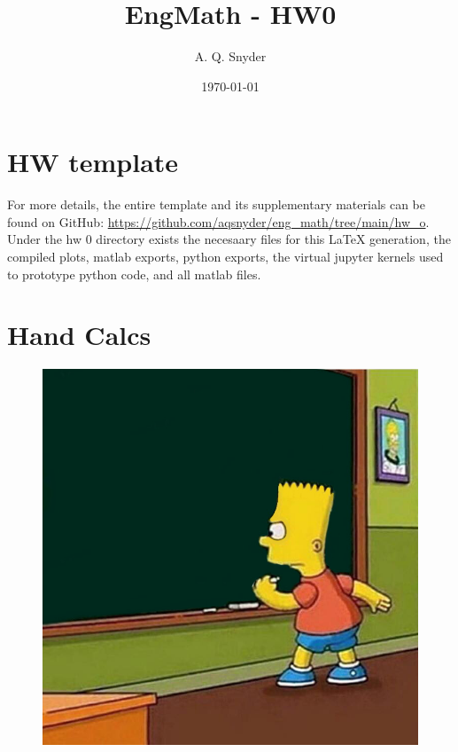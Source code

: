 \documentclass{article}
\begin{document}
\title{EngMath - HW0}
\author{A. Q. Snyder}
\date{\today}

\maketitle

\section{HW template}

\parbox{\textwidth}{
For more details, the entire template and its supplementary materials can be found on GitHub: \href{https://github.com/aqsnyder/eng_math/tree/main/hw_o}{https://github.com/aqsnyder/eng\_math/tree/main/hw\_o}.
Under the hw 0 directory exists the necesaary files for this LaTeX generation,  the compiled plots, matlab exports, python exports, the virtual jupyter kernels used to prototype python code, and all matlab files.
}

\section{Hand Calcs}
\begin{figure}[h]
    \centering
    \includegraphics[width=1\textwidth]{hand-calcs.jpg}
\end{figure}
\end{document}
